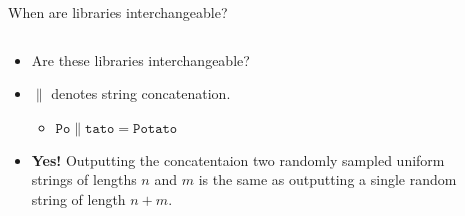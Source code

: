 \documentclass[aspectratio=169, lualatex, handout]{beamer}
\begin{document}
\begin{frame}{When are libraries interchangeable?}
	\begin{columns}[c]
		\begin{column}{0.5\textwidth}
			\begin{itemize}[<+->]
				\item Are these libraries interchangeable?
				\item $\|$ denotes string concatenation.
				      \begin{itemize}
					      \item $\texttt{Po} \| \texttt{tato} = \texttt{Potato}$
				      \end{itemize}
				\item \textbf{Yes!} Outputting the concatentaion two randomly sampled uniform strings of lengths $n$ and $m$ is the same as outputting a single random string of length $n + m$.
			\end{itemize}
		\end{column}
		\begin{column}{0.05\textwidth}
		\end{column}
		\begin{column}{0.45\textwidth}
		\end{column}
	\end{columns}
\end{frame}
\end{document}

